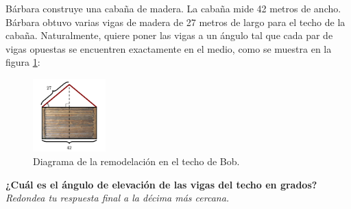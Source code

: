 \question[25] Bárbara construye una cabaña de madera. La cabaña mide 42 metros de ancho.
Bárbara obtuvo varias vigas de madera de 27 metros de largo para el techo de la cabaña.
Naturalmente, quiere poner las vigas a un ángulo tal que cada par de vigas opuestas se
encuentren exactamente en el medio, como se muestra en la figura \ref{fig:techo2}:
\begin{figure}[H]
    \begin{center}
        \includegraphics[width=0.25\textwidth]{../images/techo2.png}
    \end{center}
    \caption{Diagrama de la remodelación en el techo de Bob.}
    \label{fig:techo2}
\end{figure}
\textbf{¿Cuál es el ángulo de elevación de las vigas del techo en grados?}\\
\textit{Redondea tu respuesta final a la décima más cercana.}